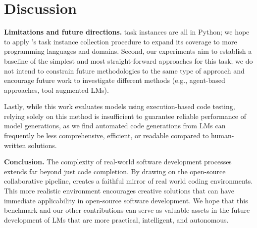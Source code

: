 \section{Discussion}
\label{sec:discussion}

\textbf{Limitations and future directions.}
\benchmark{} task instances are all in Python; we hope to apply \benchmark{}'s task instance collection procedure to expand its coverage to more programming languages and domains.
Second, our experiments aim to establish a baseline of the simplest and most straight-forward approaches for this task; we do not intend to constrain future methodologies to the same type of approach and encourage future work to investigate different methods (e.g., agent-based approaches, tool augmented LMs).

Lastly, while this work evaluates models using execution-based code testing, relying solely on this method is insufficient to guarantee reliable performance of model generations, as we find automated code generations from LMs can frequently be less comprehensive, efficient, or readable compared to human-written solutions.

\textbf{Conclusion.}
The complexity of real-world software development processes extends far beyond just code completion.
By drawing on the open-source collaborative pipeline, \benchmark{} creates a faithful mirror of real world coding environments.
This more realistic environment encourages creative solutions that can have immediate applicability in open-source software development.
We hope that this benchmark and our other contributions can serve as valuable assets in the future development of LMs that are more practical, intelligent, and autonomous.
